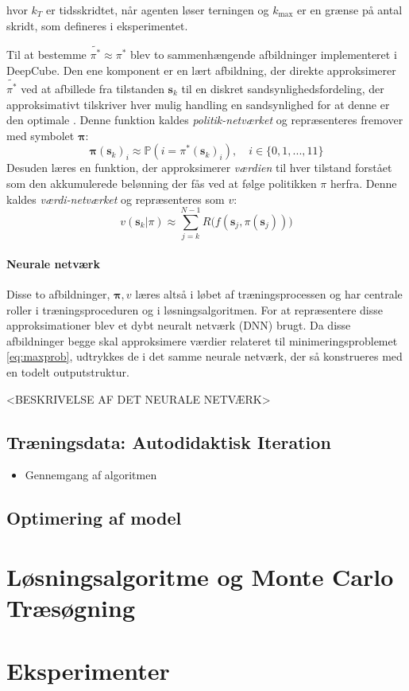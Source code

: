 \documentclass[../main.tex]{subfiles}
\begin{document}
hvor \(k_T\) er tidsskridtet, når agenten løser terningen og \(k_{\text{max}}\) er en grænse på antal skridt,  som defineres i eksperimentet. 

Til at bestemme \(\widetilde {\pi ^*} \approx 	\pi^*\) blev to sammenhængende afbildninger implementeret i DeepCube. Den ene komponent er en lært afbildning, der direkte approksimerer \(\widetilde {\pi ^*}\) ved at afbillede fra tilstanden \(\mathbf s_k\) til en diskret sandsynlighedsfordeling, der approksimativt tilskriver hver mulig handling en sandsynlighed for at denne er den optimale . Denne funktion kaldes \textit{politik-netværket} og repræsenteres fremover med symbolet \(\bm \pi\):
\[
\bm \pi(\mathbf s_k)_i \approx \mathbb P (i = \pi^*(\mathbf s_k)_i),\quad i \in \{0,1, ..., 11\}
\]
Desuden læres en funktion, der approksimerer \textit{værdien} til hver tilstand forstået som den akkumulerede belønning der fås ved at følge politikken \(\pi\) herfra. Denne kaldes \textit{værdi-netværket} og repræsenteres som \(v\):
\[
v(\mathbf s_k| \pi) \approx \sum_{j=k}^{N-1} R\big(f(\mathbf s_j,\pi(\mathbf s_j))\big)
\]
\paragraph{Neurale netværk} Disse to afbildninger, \(\bm \pi, v\) læres altså i løbet af træningsprocessen og har centrale roller i træningsproceduren og i løsningsalgoritmen. For at repræsentere disse approksimationer blev et dybt neuralt netværk (DNN) brugt. Da disse afbildninger begge skal approksimere værdier relateret til minimeringsproblemet \eqref{eq:maxprob}, udtrykkes de i det samme neurale netværk, der så konstrueres med en todelt outputstruktur.

<BESKRIVELSE AF DET NEURALE NETVÆRK>

 
\subsection{Træningsdata: Autodidaktisk Iteration}


\begin{itemize}
	\item Gennemgang af algoritmen
\end{itemize}

\subsection{Optimering af model}




\section{Løsningsalgoritme og Monte Carlo Træsøgning}

\section{Eksperimenter}
\end{document}
